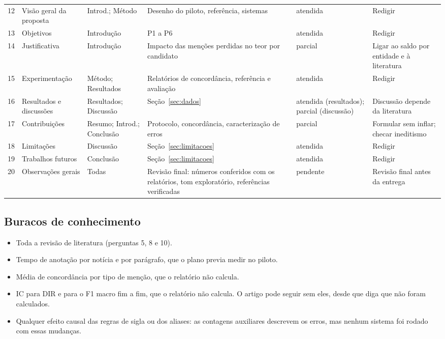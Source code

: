 \documentclass[11pt,a4paper]{article}
\begin{document}
\begin{small}
\begin{longtable}{@{}P{0.5cm}P{3.3cm}P{2.0cm}P{4.2cm}P{1.6cm}P{2.6cm}@{}}
12 & Visão geral da proposta & Introd.; Método & Desenho do piloto, referência, sistemas & atendida & Redigir \\
13 & Objetivos & Introdução & P1 a P6 & atendida & Redigir \\
14 & Justificativa & Introdução & Impacto das menções perdidas no teor por candidato & parcial & Ligar ao saldo por entidade e à literatura \\
15 & Experimentação & Método; Resultados & Relatórios de concordância, referência e avaliação & atendida & Redigir \\
16 & Resultados e discussões & Resultados; Discussão & Seção~\ref{sec:dados} & atendida (resultados); parcial (discussão) & Discussão depende da literatura \\
17 & Contribuições & Resumo; Introd.; Conclusão & Protocolo, concordância, caracterização de erros & parcial & Formular sem inflar; checar ineditismo \\
18 & Limitações & Discussão & Seção~\ref{sec:limitacoes} & atendida & Redigir \\
19 & Trabalhos futuros & Conclusão & Seção~\ref{sec:limitacoes} & atendida & Redigir \\
20 & Observações gerais & Todas & Revisão final: números conferidos com os relatórios, tom exploratório, referências verificadas & pendente & Revisão final antes da entrega \\
\end{longtable}
\end{small}

\subsection{Buracos de conhecimento}

\begin{itemize}
\item Toda a revisão de literatura (perguntas 5, 8 e 10).
\item Tempo de anotação por notícia e por parágrafo, que o plano previa medir no piloto.
\item Média de concordância por tipo de menção, que o relatório não calcula.
\item IC para DIR e para o F1 macro fim a fim, que o relatório não calcula. O artigo pode seguir sem eles, desde que diga que não foram calculados.
\item Qualquer efeito causal das regras de sigla ou dos aliases: as contagens auxiliares descrevem os erros, mas nenhum sistema foi rodado com essas mudanças.
\end{itemize}
\end{document}
